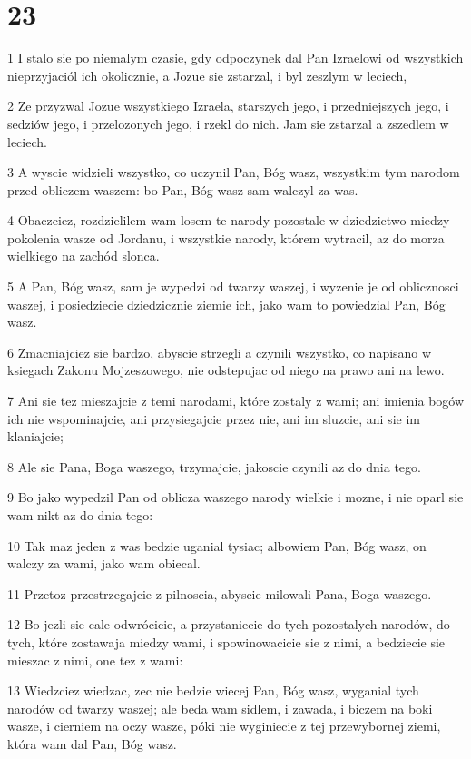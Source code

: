 \chapter{23}

\par 1 I stalo sie po niemalym czasie, gdy odpoczynek dal Pan Izraelowi od wszystkich nieprzyjaciól ich okolicznie, a Jozue sie zstarzal, i byl zeszlym w leciech,
\par 2 Ze przyzwal Jozue wszystkiego Izraela, starszych jego, i przedniejszych jego, i sedziów jego, i przelozonych jego, i rzekl do nich. Jam sie zstarzal a zszedlem w leciech.
\par 3 A wyscie widzieli wszystko, co uczynil Pan, Bóg wasz, wszystkim tym narodom przed obliczem waszem: bo Pan, Bóg wasz sam walczyl za was.
\par 4 Obaczciez, rozdzielilem wam losem te narody pozostale w dziedzictwo miedzy pokolenia wasze od Jordanu, i wszystkie narody, którem wytracil, az do morza wielkiego na zachód slonca.
\par 5 A Pan, Bóg wasz, sam je wypedzi od twarzy waszej, i wyzenie je od oblicznosci waszej, i posiedziecie dziedzicznie ziemie ich, jako wam to powiedzial Pan, Bóg wasz.
\par 6 Zmacniajciez sie bardzo, abyscie strzegli a czynili wszystko, co napisano w ksiegach Zakonu Mojzeszowego, nie odstepujac od niego na prawo ani na lewo.
\par 7 Ani sie tez mieszajcie z temi narodami, które zostaly z wami; ani imienia bogów ich nie wspominajcie, ani przysiegajcie przez nie, ani im sluzcie, ani sie im klaniajcie;
\par 8 Ale sie Pana, Boga waszego, trzymajcie, jakoscie czynili az do dnia tego.
\par 9 Bo jako wypedzil Pan od oblicza waszego narody wielkie i mozne, i nie oparl sie wam nikt az do dnia tego:
\par 10 Tak maz jeden z was bedzie uganial tysiac; albowiem Pan, Bóg wasz, on walczy za wami, jako wam obiecal.
\par 11 Przetoz przestrzegajcie z pilnoscia, abyscie milowali Pana, Boga waszego.
\par 12 Bo jezli sie cale odwrócicie, a przystaniecie do tych pozostalych narodów, do tych, które zostawaja miedzy wami, i spowinowacicie sie z nimi, a bedziecie sie mieszac z nimi, one tez z wami:
\par 13 Wiedzciez wiedzac, zec nie bedzie wiecej Pan, Bóg wasz, wyganial tych narodów od twarzy waszej; ale beda wam sidlem, i zawada, i biczem na boki wasze, i cierniem na oczy wasze, póki nie wyginiecie z tej przewybornej ziemi, która wam dal Pan, Bóg wasz.
